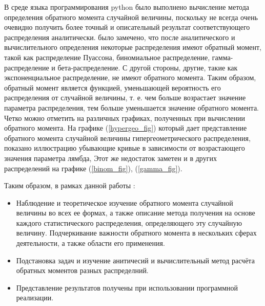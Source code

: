 \documentclass[13pt]{article}
\begin{document}
В среде языка программирования python было выполнено вычисление метода определения обратного момента случайной величины, поскольку не всегда очень очевидно получить более точный и описательный результат соответствующего распределения аналитически. было замечено, что после аналитического и вычислительного определения некоторые распределения имеют обратный момент, такой как распределение Пуассона, биномиальное распределение, гамма-распределение и бета-распределение. С другой стороны, другие, такие как экспоненциальное распределение, не имеют обратного момента. Таким образом, обратный момент является функцией, уменьшающей вероятность его распределения от случайной величины, т. е. чем больше возрастает значение параметра распределения, тем больше уменьшается значение обратного момента. Четко можно отметить  на различных графиках, полученных при вычислении обратного момента. На графике (\ref{hypergeo_fig}) который дает представление обратного момента случайной величины гипергеометрического распределения, показано иллюстрацию убывающие кривые в зависимости от возрастающего значения параметра лямбда, Этот же недостаток заметен и в других распределений на графике (\ref{binom_fig}), (\ref{gamma_fig}). 

Таким образом, в рамках данной работы :\par 
\begin{itemize}
    \item  Наблюдение и теоретическое изучение обратного момента случайной величины во всех ее формах, а также описание метода получения на основе каждого статистического распределения, определяющего эту случайную величину. Подчеркивание важности обратного момента в нескольких сферах деятельности, а также области его применения.\par
    \item Подстановка задач и изучение анитичесий и вычислительный метод расчёта обратных моментов разных распределний. 
    \item Представление результатов получены при использовании программной реализации.
\end{itemize} 

\newpage

\printbibliography


\end{document}
